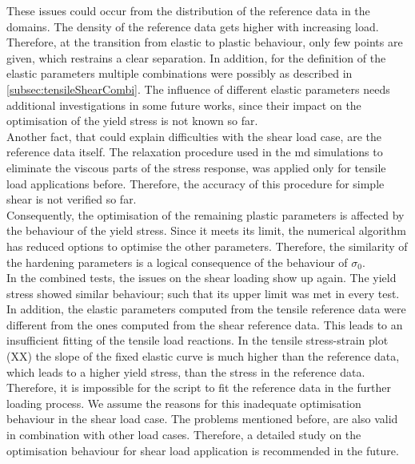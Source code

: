 These issues could occur from the distribution of the reference data in the domains.
The density of the reference data gets higher with increasing load.
Therefore, at the transition from elastic to plastic behaviour, only few points are given, which restrains a clear separation. In addition, for the definition of the elastic parameters multiple combinations were possibly as described in \autoref{subsec:tensileShearCombi}. The influence of different elastic parameters needs additional investigations in some future works, since their impact on the optimisation of the yield stress is not known so far. \\
\indent Another fact, that could explain difficulties with the shear load case, are the reference data itself. The relaxation procedure used in the \acrshort{md} simulations to eliminate the viscous parts of the stress response, was applied only for tensile load applications before. Therefore, the accuracy of this procedure for simple shear is not verified so far. \\
\indent Consequently, the optimisation of the remaining plastic parameters is affected by the behaviour of the yield stress. Since it meets its limit, the numerical algorithm has reduced options to optimise the other parameters. Therefore, the similarity of the hardening parameters is a logical consequence of the behaviour of $\sigma_0$. \\
\indent In the combined tests, the issues on the shear loading show up again. The yield stress showed similar behaviour; such that its upper limit was met in every test.
In addition, the elastic parameters computed from the tensile reference data were different from the ones computed from the shear reference data.
This leads to an insufficient fitting of the tensile load reactions. In the tensile stress-strain plot (XX) the slope of the fixed elastic curve is much higher than the reference data, which leads to a higher yield stress, than the stress in the reference data. Therefore, it is impossible for the script to fit the reference data in the further loading process. We assume the reasons for this inadequate optimisation behaviour in the shear load case. The problems mentioned before, are also valid in combination with other load cases. Therefore, a detailed study on the optimisation behaviour for shear load application is recommended in the future.

 



